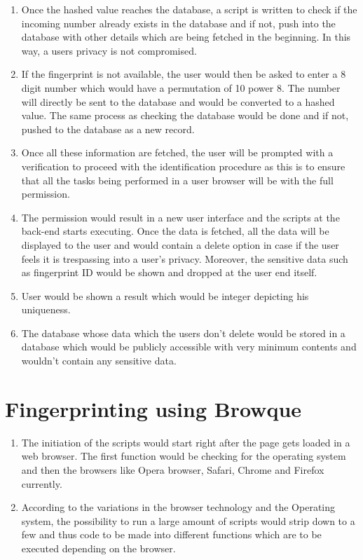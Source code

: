 \documentclass[journal]{IEEEtran}
\begin{document}
\begin{enumerate}
  \item Once the hashed value reaches the database, a script is written to check if the incoming number already exists in the database and if not, push into the database with other details which are being fetched in the beginning. In this way, a users privacy is not compromised.
  \item If the fingerprint is not available, the user would then be asked to enter a 8 digit number which would have a permutation of 10 power 8. The number will directly be sent to the database and would be converted to a hashed value. The same process as checking the database would be done and if not, pushed to the database as a new record.
  \item Once all these information are fetched, the user will be prompted with a
  verification to proceed with the identification procedure as this is to ensure that all the tasks being performed in a user browser will be with the full permission. 
  \item The permission would result in a new user interface and the scripts at the back-end starts
  executing. Once the data is fetched, all the data will be displayed to the user and
  would contain a delete option in case if the user feels it is trespassing into a user's
  privacy. Moreover, the sensitive data such as fingerprint ID would be shown and dropped at the user end itself.
  \item User would be shown a result which would be integer depicting his uniqueness. 
  \item The database whose data which the users don't delete would be stored in a database which would
  be publicly accessible with very minimum contents and wouldn't contain any sensitive data.
\end{enumerate}

\section{Fingerprinting using Browque}
\begin{enumerate}
\item The initiation of the scripts would start right after the page gets loaded in a web browser. The first function would be checking for the operating system and then the browsers like Opera browser, Safari, Chrome and Firefox currently. 
\item According to the variations in the browser technology and the Operating system, the possibility to run a large amount of scripts would strip down to a few and thus code to be made into different functions which are to be executed depending on the browser.

\end{enumerate}
\end{document}

